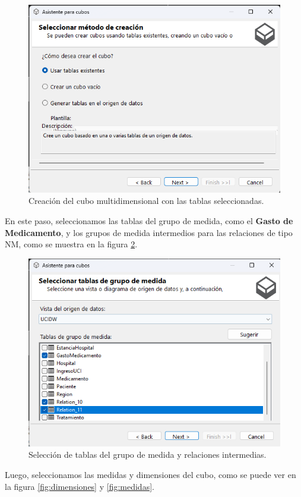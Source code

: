 \documentclass{article}
\begin{document}
\begin{figure}[H]
	\begin{center} 
		\includegraphics[width=.7\textwidth]{images/cubo1.png} 
		\caption{Creación del cubo multidimensional con las tablas seleccionadas.}
		\label{fig:cubo1}
	\end{center}
\end{figure}

En este paso, seleccionamos las tablas del grupo de medida, como el \textbf{Gasto de Medicamento}, y los grupos de medida intermedios para las relaciones de tipo NM, como se muestra en la figura \ref{fig:cubo_medidas}.

\begin{figure}[H]
	\begin{center} 
		\includegraphics[width=.7\textwidth]{images/cubo_medidas.png} 
		\caption{Selección de tablas del grupo de medida y relaciones intermedias.}
		\label{fig:cubo_medidas}
	\end{center}
\end{figure}

Luego, seleccionamos las medidas y dimensiones del cubo, como se puede ver en la figura \ref{fig:dimensiones} y \ref{fig:medidas}.
\end{document}
